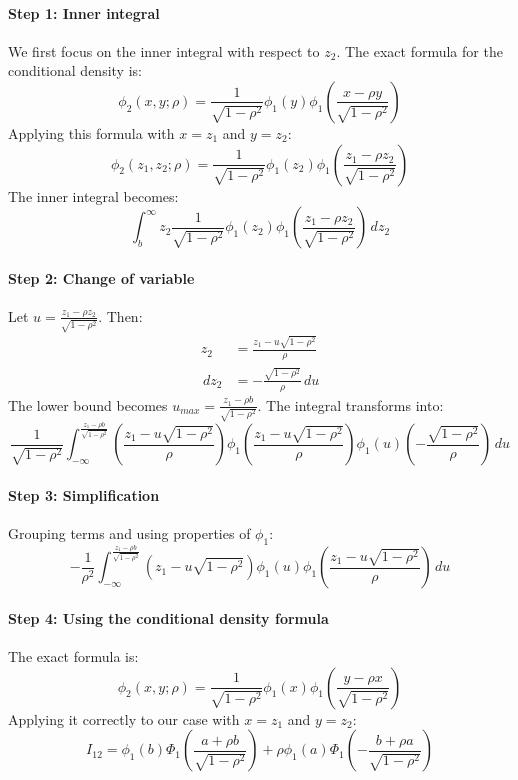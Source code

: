 \documentclass[a4paper]{article}
\newcommand{\dd}{\,d}
\begin{document}
\paragraph{Step 1: Inner integral}
We first focus on the inner integral with respect to $z_2$. The exact formula for the conditional density is:
\[
\phi_2(x,y;\rho) = \frac{1}{\sqrt{1-\rho^2}} \phi_1(y) \phi_1\left(\frac{x-\rho y}{\sqrt{1-\rho^2}}\right)
\]
Applying this formula with $x=z_1$ and $y=z_2$:
\[
\phi_2(z_1,z_2;\rho) = \frac{1}{\sqrt{1-\rho^2}} \phi_1(z_2) \phi_1\left(\frac{z_1-\rho z_2}{\sqrt{1-\rho^2}}\right)
\]
The inner integral becomes:
\[
\int_b^\infty z_2 \frac{1}{\sqrt{1-\rho^2}} \phi_1(z_2) \phi_1\left(\frac{z_1-\rho z_2}{\sqrt{1-\rho^2}}\right) \dd z_2
\]

\paragraph{Step 2: Change of variable}
Let $u = \frac{z_1-\rho z_2}{\sqrt{1-\rho^2}}$. Then:
\begin{align*}
z_2 &= \frac{z_1-u\sqrt{1-\rho^2}}{\rho} \\
\dd z_2 &= -\frac{\sqrt{1-\rho^2}}{\rho} \dd u
\end{align*}
The lower bound becomes $u_{max} = \frac{z_1-\rho b}{\sqrt{1-\rho^2}}$. The integral transforms into:
\[
\frac{1}{\sqrt{1-\rho^2}} \int_{-\infty}^{\frac{z_1-\rho b}{\sqrt{1-\rho^2}}} \left(\frac{z_1-u\sqrt{1-\rho^2}}{\rho}\right) \phi_1\left(\frac{z_1-u\sqrt{1-\rho^2}}{\rho}\right) \phi_1(u) \left(-\frac{\sqrt{1-\rho^2}}{\rho}\right) \dd u
\]

\paragraph{Step 3: Simplification}
Grouping terms and using properties of $\phi_1$:
\[
-\frac{1}{\rho^2} \int_{-\infty}^{\frac{z_1-\rho b}{\sqrt{1-\rho^2}}} (z_1-u\sqrt{1-\rho^2}) \phi_1(u) \phi_1\left(\frac{z_1-u\sqrt{1-\rho^2}}{\rho}\right) \dd u
\]

\paragraph{Step 4: Using the conditional density formula}
The exact formula is:
\[
\phi_2(x,y;\rho) = \frac{1}{\sqrt{1-\rho^2}} \phi_1(x) \phi_1\left(\frac{y-\rho x}{\sqrt{1-\rho^2}}\right)
\]
Applying it correctly to our case with $x=z_1$ and $y=z_2$:
\[
I_{12} = \phi_1(b)\Phi_1\left(\frac{a+\rho b}{\sqrt{1-\rho^2}}\right) + \rho\phi_1(a)\Phi_1\left(-\frac{b+\rho a}{\sqrt{1-\rho^2}}\right)
\]
\end{document}
